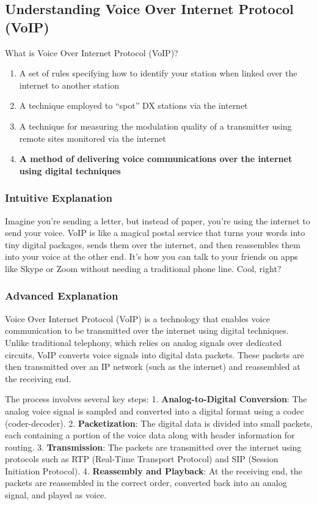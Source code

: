 \subsection{Understanding Voice Over Internet Protocol (VoIP)}
\label{T8C07}

\begin{tcolorbox}[colback=gray!10!white,colframe=black!75!black,title=T8C07]
What is Voice Over Internet Protocol (VoIP)?  
\begin{enumerate}[label=\Alph*.]  
    \item A set of rules specifying how to identify your station when linked over the internet to another station  
    \item A technique employed to “spot” DX stations via the internet  
    \item A technique for measuring the modulation quality of a transmitter using remote sites monitored via the internet  
    \item \textbf{A method of delivering voice communications over the internet using digital techniques}  
\end{enumerate}  
\end{tcolorbox}

\subsubsection{Intuitive Explanation}  
Imagine you’re sending a letter, but instead of paper, you’re using the internet to send your voice. VoIP is like a magical postal service that turns your words into tiny digital packages, sends them over the internet, and then reassembles them into your voice at the other end. It’s how you can talk to your friends on apps like Skype or Zoom without needing a traditional phone line. Cool, right?

\subsubsection{Advanced Explanation}  
Voice Over Internet Protocol (VoIP) is a technology that enables voice communication to be transmitted over the internet using digital techniques. Unlike traditional telephony, which relies on analog signals over dedicated circuits, VoIP converts voice signals into digital data packets. These packets are then transmitted over an IP network (such as the internet) and reassembled at the receiving end.  

The process involves several key steps:  
1. \textbf{Analog-to-Digital Conversion}: The analog voice signal is sampled and converted into a digital format using a codec (coder-decoder).  
2. \textbf{Packetization}: The digital data is divided into small packets, each containing a portion of the voice data along with header information for routing.  
3. \textbf{Transmission}: The packets are transmitted over the internet using protocols such as RTP (Real-Time Transport Protocol) and SIP (Session Initiation Protocol).  
4. \textbf{Reassembly and Playback}: At the receiving end, the packets are reassembled in the correct order, converted back into an analog signal, and played as voice.  

